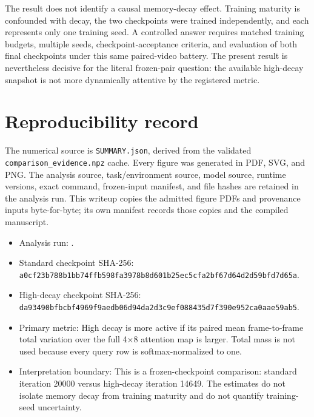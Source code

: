 \documentclass[11pt]{article}
\begin{document}
The result does not identify a causal memory-decay effect. Training maturity is confounded with decay, the two checkpoints were trained independently, and each represents only one training seed. A controlled answer requires matched training budgets, multiple seeds, checkpoint-acceptance criteria, and evaluation of both final checkpoints under this same paired-video battery. The present result is nevertheless decisive for the literal frozen-pair question: the available high-decay snapshot is not more dynamically attentive by the registered metric.

\section{Reproducibility record}
The numerical source is \texttt{SUMMARY.json}, derived from the validated \texttt{comparison\_evidence.npz} cache. Every figure was generated in PDF, SVG, and PNG. The analysis source, task/environment source, model source, runtime versions, exact command, frozen-input manifest, and file hashes are retained in the analysis run. This writeup copies the admitted figure PDFs and provenance inputs byte-for-byte; its own manifest records those copies and the compiled manuscript.

\begin{itemize}
\item Analysis run: .
\item Standard checkpoint SHA-256: {\footnotesize\texttt{a0cf23b7\allowbreak{}88b1bb74\allowbreak{}ffb598fa\allowbreak{}3978b8d6\allowbreak{}01b25ec5\allowbreak{}cfa2bf67\allowbreak{}d64d2d59\allowbreak{}bfd7d65a}}.
\item High-decay checkpoint SHA-256: {\footnotesize\texttt{da93490b\allowbreak{}fbcbf496\allowbreak{}9f9aedb0\allowbreak{}6d94da2d\allowbreak{}3c9ef088\allowbreak{}435d7f39\allowbreak{}0e952ca0\allowbreak{}aae59ab5}}.
\item Primary metric: High decay is more active if its paired mean frame-to-frame total variation over the full 4×8 attention map is larger. Total mass is not used because every query row is softmax-normalized to one.
\item Interpretation boundary: This is a frozen-checkpoint comparison: standard iteration 20000 versus high-decay iteration 14649. The estimates do not isolate memory decay from training maturity and do not quantify training-seed uncertainty.
\end{itemize}
\end{document}
